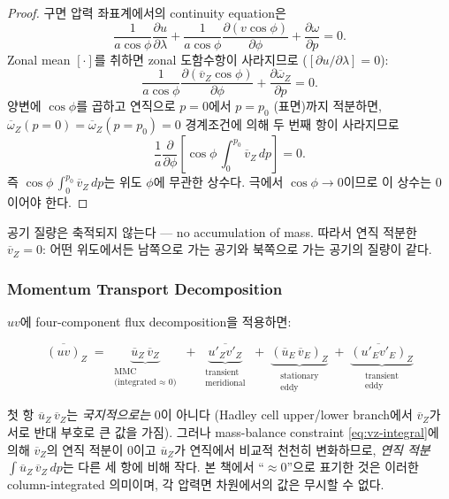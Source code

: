 \begin{proof}
  구면 압력 좌표계에서의 continuity equation은
  \[
    \frac{1}{a\cos\phi}\frac{\partial u}{\partial \lambda}
    + \frac{1}{a\cos\phi}\frac{\partial (v\cos\phi)}{\partial \phi}
    + \frac{\partial \omega}{\partial p} = 0.
  \]
  Zonal mean $[\cdot]$를 취하면 zonal 도함수항이 사라지므로
  ($[\partial u/\partial \lambda] = 0$):
  \[
    \frac{1}{a\cos\phi}\frac{\partial (\overline{v}_Z\cos\phi)}{\partial \phi}
    + \frac{\partial \overline{\omega}_Z}{\partial p} = 0.
  \]
  양변에 $\cos\phi$를 곱하고 연직으로 $p=0$에서 $p=p_0$ (표면)까지 적분하면,
  $\overline{\omega}_Z(p=0)=\overline{\omega}_Z(p=p_0)=0$ 경계조건에 의해
  두 번째 항이 사라지므로
  \[
    \frac{1}{a}\frac{\partial}{\partial \phi}
    \!\left[\cos\phi\,\int_0^{p_0}\!\overline{v}_Z\,dp\right] = 0.
  \]
  즉 $\cos\phi\,\int_0^{p_0}\!\overline{v}_Z\,dp$는 위도 $\phi$에 무관한 상수다.
  극에서 $\cos\phi\to 0$이므로 이 상수는 0이어야 한다.
\end{proof}

\begin{hisublock}
  공기 질량은 축적되지 않는다 --- no accumulation of mass.
  따라서 연직 적분한 $\overline{v}_Z = 0$: 어떤 위도에서든 남쪽으로 가는
  공기와 북쪽으로 가는 공기의 질량이 같다.
\end{hisublock}

\subsubsection*{Momentum Transport Decomposition}

$uv$에 four-component flux decomposition을 적용하면:

\begin{equation}\label{eq:uv-decomp}
  \overline{(uv)}_Z
  \;=\; \underbrace{\overline{u}_Z\,\overline{v}_Z}_{\substack{\text{MMC}\\\text{(integrated $\approx$ 0)}}}
  \;+\; \underbrace{\overline{u'_Z v'_Z}}_{\substack{\text{transient}\\\text{meridional}}}
  \;+\; \underbrace{(\overline{u}_E\,\overline{v}_E)_Z}_{\substack{\text{stationary}\\\text{eddy}}}
  \;+\; \underbrace{\overline{(u'_E v'_E)}_Z}_{\substack{\text{transient}\\\text{eddy}}}
\end{equation}

\begin{remark}

   첫 항 $\overline{u}_Z\,\overline{v}_Z$는
  \emph{국지적으로는} 0이 아니다 (Hadley cell upper/lower branch에서
  $\overline{v}_Z$가 서로 반대 부호로 큰 값을 가짐).  그러나 mass-balance
  constraint \eqref{eq:vz-integral}에 의해 $\overline{v}_Z$의 연직 적분이
  0이고 $\overline{u}_Z$가 연직에서 비교적 천천히 변화하므로,
  \emph{연직 적분} $\int \overline{u}_Z\,\overline{v}_Z\,dp$는 다른 세 항에
  비해 작다.  본 책에서 ``$\approx 0$''으로 표기한 것은 이러한
  column-integrated 의미이며, 각 압력면 차원에서의 값은 무시할 수 없다.
\end{remark}

